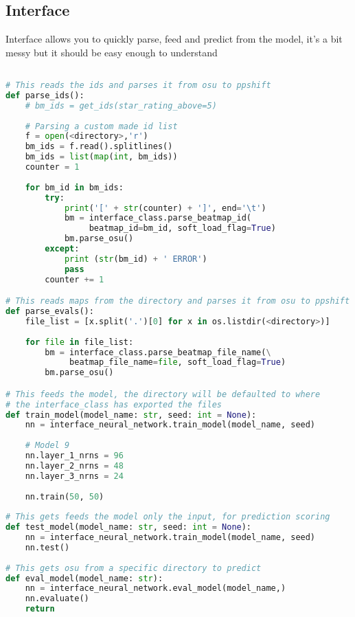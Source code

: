 \subsection{Interface}

Interface allows you to quickly parse, feed and predict from the model, it's a bit messy but it should be easy enough to understand

\begin{lstlisting}[language=Python]

# This reads the ids and parses it from osu to ppshift
def parse_ids():
    # bm_ids = get_ids(star_rating_above=5)
    
    # Parsing a custom made id list
    f = open(<directory>,'r')
    bm_ids = f.read().splitlines()
    bm_ids = list(map(int, bm_ids))
    counter = 1
    
    for bm_id in bm_ids:
        try:
            print('[' + str(counter) + ']', end='\t')
            bm = interface_class.parse_beatmap_id(
                 beatmap_id=bm_id, soft_load_flag=True)
            bm.parse_osu()
        except:
            print (str(bm_id) + ' ERROR')
            pass
        counter += 1

# This reads maps from the directory and parses it from osu to ppshift      
def parse_evals():
    file_list = [x.split('.')[0] for x in os.listdir(<directory>)]
    
    for file in file_list:
        bm = interface_class.parse_beatmap_file_name(\
             beatmap_file_name=file, soft_load_flag=True)
        bm.parse_osu()

# This feeds the model, the directory will be defaulted to where
# the interface_class has exported the files
def train_model(model_name: str, seed: int = None):
    nn = interface_neural_network.train_model(model_name, seed)
    
    # Model 9
    nn.layer_1_nrns = 96
    nn.layer_2_nrns = 48 
    nn.layer_3_nrns = 24 
    
    nn.train(50, 50)
   
# This gets feeds the model only the input, for prediction scoring
def test_model(model_name: str, seed: int = None):
    nn = interface_neural_network.train_model(model_name, seed)
    nn.test()
    
# This gets osu from a specific directory to predict
def eval_model(model_name: str):
    nn = interface_neural_network.eval_model(model_name,)
    nn.evaluate()
    return

\end{lstlisting}


